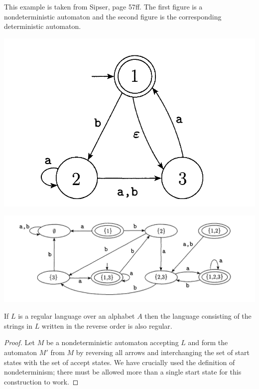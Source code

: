 \begin{eg} This example is taken from Sipser, page 57ff. The first
    figure is a nondeterministic automaton and the second figure is
    the corresponding deterministic automaton.

    \begin{center}
        \includegraphics[scale=0.4]{resources/sipser1.pdf}
    \end{center}

    \begin{center}
        \includegraphics[scale=0.4]{resources/sipser2.pdf}
    \end{center}
\end{eg}

\begin{thm}[reversal] If $L$ is a regular language over an alphabet
    $A$ then the language consisting of the strings in $L$ written in
    the reverse order is also regular.
\end{thm}
\begin{proof} Let $M$ be a nondeterministic automaton accepting $L$
    and form the automaton $M'$ from $M$ by reversing all arrows and
    interchanging the set of start states with the set of accept
    states. We have crucially used the definition of nondeterminism;
    there must be allowed more than a single start state for this
    construction to work.
\end{proof}

